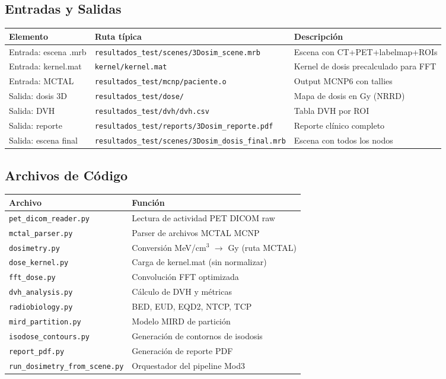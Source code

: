 \documentclass[12pt,a4paper]{article}
\begin{document}
\subsection{Entradas y Salidas}

\begin{tabular}{p{4cm} p{5cm} p{5cm}}
\toprule
\textbf{Elemento} & \textbf{Ruta típica} & \textbf{Descripción} \\
\midrule
Entrada: escena .mrb & \texttt{resultados\_test/scenes/3Dosim\_scene.mrb} & Escena con CT+PET+labelmap+ROIs \\
Entrada: kernel.mat & \texttt{kernel/kernel.mat} & Kernel de dosis precalculado para FFT \\
Entrada: MCTAL & \texttt{resultados\_test/mcnp/paciente.o} & Output MCNP6 con tallies \\
Salida: dosis 3D & \texttt{resultados\_test/dose/} & Mapa de dosis en Gy (NRRD) \\
Salida: DVH & \texttt{resultados\_test/dvh/dvh.csv} & Tabla DVH por ROI \\
Salida: reporte & \texttt{resultados\_test/reports/3Dosim\_reporte.pdf} & Reporte clínico completo \\
Salida: escena final & \texttt{resultados\_test/scenes/3Dosim\_dosis\_final.mrb} & Escena con todos los nodos \\
\bottomrule
\end{tabular}

\subsection*{Archivos de Código}

\begin{tabular}{p{5cm} p{10cm}}
\toprule
\textbf{Archivo} & \textbf{Función} \\
\midrule
\texttt{pet\_dicom\_reader.py} & Lectura de actividad PET DICOM raw \\
\texttt{mctal\_parser.py} & Parser de archivos MCTAL MCNP \\
\texttt{dosimetry.py} & Conversión MeV/cm$^3$ $\to$ Gy (ruta MCTAL) \\
\texttt{dose\_kernel.py} & Carga de kernel.mat (sin normalizar) \\
\texttt{fft\_dose.py} & Convolución FFT optimizada \\
\texttt{dvh\_analysis.py} & Cálculo de DVH y métricas \\
\texttt{radiobiology.py} & BED, EUD, EQD2, NTCP, TCP \\
\texttt{mird\_partition.py} & Modelo MIRD de partición \\
\texttt{isodose\_contours.py} & Generación de contornos de isodosis \\
\texttt{report\_pdf.py} & Generación de reporte PDF \\
\texttt{run\_dosimetry\_from\_scene.py} & Orquestador del pipeline Mod3 \\
\bottomrule
\end{tabular}
\end{document}
